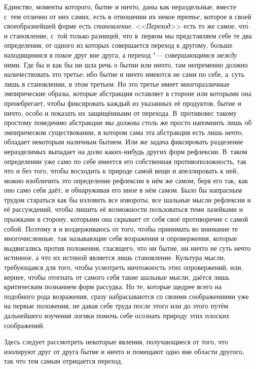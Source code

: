 Единство, моменты которого, бытие и ничто, даны как нераздельные, вместе с~тем
отлично от них самих, есть в отношении их некое {\em третье,} которое в своей
своеобразнейшей форме есть {\em становление}. <<{\em Переход}>> есть то же
самое, чт\'{о} и становление, с~той только разницей, что в~первом мы
представляем себе те два определения, от одного из которых совершается переход
к другому, больше находящимися в покое друг вне друга, а переход "---
совершающимся {\em между} ними. Где бы и как бы ни шла речь о бытии или ничто,
там непременно должно наличествовать это третье; ибо бытие и ничто имеются не
сами по себе, а~суть лишь в становлении, в этом третьем. Но это третье имеет
многоразличные эмпирические образы, которые абстракция оставляет в стороне или
которыми она пренебрегает, чтобы фиксировать каждый из указанных её продуктов,
бытие и ничто, особо и показать их защищёнными от перехода. В~противовес такому
простому поведению абстракции мы должны столь же просто напомнить лишь об
эмпирическом существовании, в котором сама эта абстракция есть лишь нечто,
обладает некоторым наличным бытием. Или же задача фиксировать разделение
неразделимых выпадает на долю каких-нибудь других форм рефлексии. В~таком
определении уже само по себе имеется его собственная противоположность, так что
и без того, чтобы восходить к природе самой вещи и апеллировать к ней, можно
изобличить это определение рефлексии в нём же самом, беря его так, как оно само
себя даёт, и обнаруживая его иное в нём самом. Было бы напрасным трудом
стараться как бы изловить все извороты, все шальные мысли рефлексии и её
рассуждений, чтобы лишить её возможности пользоваться теми лазейками и прыжками
в сторону, которыми она скрывает от себя своё противоречие с самой собой.
Поэтому я и воздерживаюсь от того, чтобы принимать во внимание те
многочисленные, так называющие себя возражения и опровержения, которые
выдвигались против положения, гласящего, что ни бытие, ни ничто не суть нечто
истинное, а что их истиной является лишь становление. Культура мысли,
требующаяся для того, чтобы усмотреть ничтожность этих опровержений, или,
вернее, чтобы отогнать от самого себя такие шальные мысли, даётся лишь
критическим познанием форм рассудка. Но те, которые щедрее всего на подобного
рода возражения, сразу набрасываются со своими соображениями уже на первые
положения, не давая себе труда после этого или до этого путём дальнейшего
изучения логики помочь себе осознать природу этих плоских соображений.

Здесь следует рассмотреть некоторые явления, получающиеся от того, что
изолируют друг от друга бытие и ничто и помещают одно вне области другого,
так что тем самым отрицается переход.


